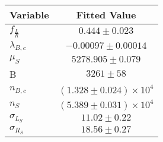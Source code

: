 \begin{tabular}[t]{lc}
\hline
Variable &Fitted Value\\
\hline\hline
$f_{\frac{L}{R}}$&$0.444\pm0.023$\\
\hline
$\lambda_{B,c}$&$-0.00097\pm0.00014$\\
\hline
$\mu_S$&$5278.905\pm0.079$\\
\hline
B&$3261\pm58$\\
\hline
$n_{B,c}$&$(1.328\pm0.024)\times 10^4$\\
\hline
$n_S$&$(5.389\pm0.031)\times 10^4$\\
\hline
$\sigma_{L_S}$&$11.02\pm0.22$\\
\hline
$\sigma_{R_S}$&$18.56\pm0.27$\\
\hline
\end{tabular}